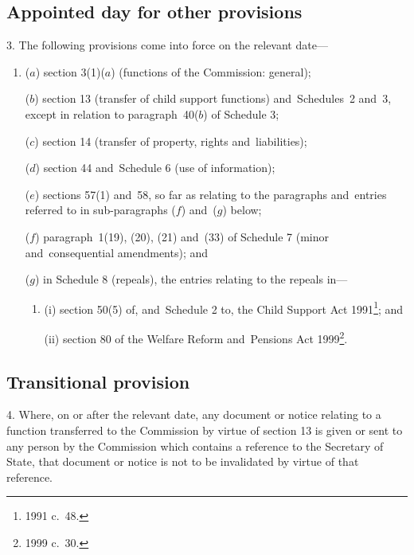 \documentclass[12pt,a4paper]{article}
\begin{document}
\subsection[3. Appointed day for other provisions]{Appointed day for other provisions}

3.  The following provisions come into force on the relevant date—
\begin{enumerate}\item[]
($a$) section 3(1)($a$)  (functions of the Commission: general);

($b$) section 13 (transfer of child support functions) and~Schedules~2 and~3, except in relation to paragraph~40($b$)  of Schedule 3;

($c$) section 14 (transfer of property, rights and~liabilities);

($d$) section 44 and~Schedule 6 (use of information);

($e$) sections 57(1) and~58, so far as relating to the paragraphs and~entries referred to in sub-paragraphs ($f$)  and~($g$)  below;

($f$) paragraph~1(19), (20), (21) and~(33) of Schedule 7 (minor and~consequential amendments); and

($g$) in Schedule 8 (repeals), the entries relating to the repeals in—
\begin{enumerate}\item[]
(i) section 50(5) of, and~Schedule 2 to, the Child Support Act 1991\footnote{1991 c.~48.}; and

(ii) section 80 of the Welfare Reform and~Pensions Act 1999\footnote{1999 c.~30.}.
\end{enumerate}
\end{enumerate}

\subsection[4. Transitional provision]{Transitional provision}

4.  Where, on or after the relevant date, any document or notice relating to a function transferred to the Commission by virtue of section 13 is given or sent to any person by the Commission which contains a reference to the Secretary of State, that document or notice is not to be invalidated by virtue of that reference. 

\bigskip

\end{document}
